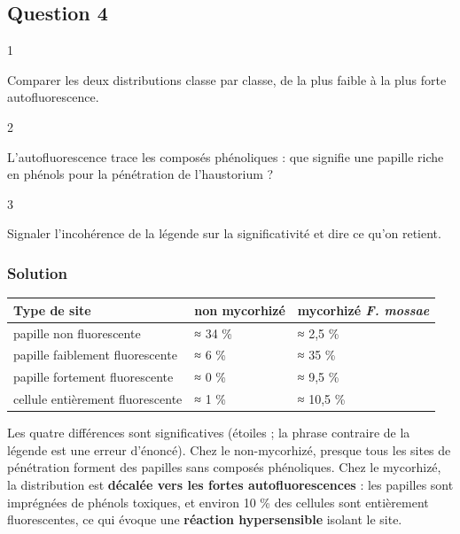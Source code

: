 \documentclass[11pt,a4paper]{article}
\begin{document}
\hypertarget{question-4}{%
\subsection{Question 4}\label{question-4}}

\begin{indication}{1}

Comparer les deux distributions classe par classe, de la plus faible à la plus forte autofluorescence.

\end{indication}

\begin{indication}{2}

L'autofluorescence trace les composés phénoliques : que signifie une papille riche en phénols pour la pénétration de l'haustorium ?

\end{indication}

\begin{indication}{3}

Signaler l'incohérence de la légende sur la significativité et dire ce qu'on retient.

\end{indication}

\hypertarget{solution-8}{%
\subsubsection{Solution}\label{solution-8}}

\begin{longtable}[]{@{}lll@{}}
\toprule\noalign{}
Type de site & non mycorhizé & mycorhizé \emph{F. mossae} \\
\midrule\noalign{}
\endhead
\bottomrule\noalign{}
\endlastfoot
papille non fluorescente & ≈ 34 \% & ≈ 2,5 \% \\
papille faiblement fluorescente & ≈ 6 \% & ≈ 35 \% \\
papille fortement fluorescente & ≈ 0 \% & ≈ 9,5 \% \\
cellule entièrement fluorescente & ≈ 1 \% & ≈ 10,5 \% \\
\end{longtable}

Les quatre différences sont significatives (étoiles ; la phrase contraire de la légende est une erreur d'énoncé). Chez le non-mycorhizé, presque tous les sites de pénétration forment des papilles sans composés phénoliques. Chez le mycorhizé, la distribution est \textbf{décalée vers les fortes autofluorescences} : les papilles sont imprégnées de phénols toxiques, et environ 10 \% des cellules sont entièrement fluorescentes, ce qui évoque une \textbf{réaction hypersensible} isolant le site.
\end{document}
